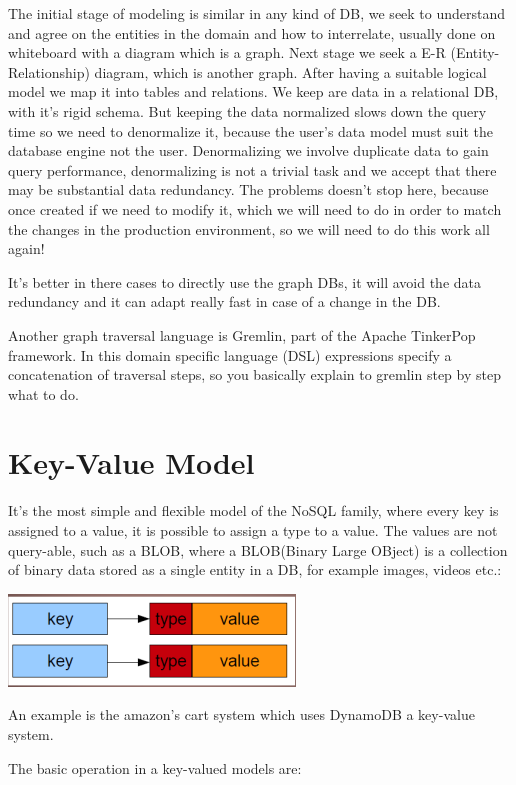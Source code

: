 \documentclass[a4page, 11pt]{article}
\begin{document}
The initial stage of modeling is similar in any kind of DB, we seek to understand and agree on the entities in the domain and how to interrelate, usually done on whiteboard with a diagram which is a graph.
Next stage we seek a E-R (Entity-Relationship) diagram, which is another graph. 
After having a suitable logical model we map it into tables and relations. 
We keep are data in a relational DB, with it's rigid schema.
But keeping the data normalized slows down the query time so we need to denormalize it, because the user's data model must suit the database engine not the user. 
Denormalizing we involve duplicate data to gain query performance, denormalizing is not a trivial task and we accept that there may be substantial data redundancy. 
The problems doesn't stop here, because once created if we need to modify it, which we will need to do in order to match the changes in the production environment, so we will need to do this work all again!

It's better in there cases to directly use the graph DBs, it will avoid the data redundancy and it can adapt really fast in case of a change in the DB.

Another graph traversal language is Gremlin, part of the Apache TinkerPop framework. In this domain specific language (DSL) expressions specify a concatenation of traversal steps, so you basically explain to gremlin step by step what to do.

\section{Key-Value Model}

It's the most simple and flexible model of the NoSQL family, where every key is assigned to a value, it is possible to assign a type to a value.
The values are not query-able, such as a BLOB, where a BLOB(Binary Large OBject) is a collection of binary data stored as a single entity in a DB, for example images, videos etc.:
\begin{center}
\includegraphics[scale=0.5]{IMAGE3.jpg}
\end{center}
An example is the amazon's cart system which uses DynamoDB a key-value system.

The basic operation in a key-valued models are:
\end{document}
